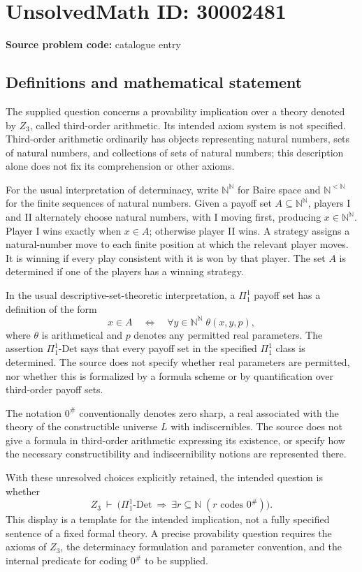 \documentclass[11pt]{article}
\newcommand{\N}{\mathbb{N}}
\begin{document}
\section*{UnsolvedMath ID: 30002481}
\textbf{Source problem code:} catalogue entry
\subsection{Definitions and mathematical statement}
The supplied question concerns a provability implication over a theory denoted by \(Z_3\), called third-order arithmetic. Its intended axiom system is not specified. Third-order arithmetic ordinarily has objects representing natural numbers, sets of natural numbers, and collections of sets of natural numbers; this description alone does not fix its comprehension or other axioms.

For the usual interpretation of determinacy, write \(\N^{\N}\) for Baire space and \(\N^{<\N}\) for the finite sequences of natural numbers. Given a payoff set \(A\subseteq\N^{\N}\), players I and II alternately choose natural numbers, with I moving first, producing \(x\in\N^{\N}\). Player I wins exactly when \(x\in A\); otherwise player II wins. A strategy assigns a natural-number move to each finite position at which the relevant player moves. It is winning if every play consistent with it is won by that player. The set \(A\) is determined if one of the players has a winning strategy.

In the usual descriptive-set-theoretic interpretation, a \(\Pi^1_1\) payoff set has a definition of the form
\[
 x\in A\quad\Longleftrightarrow\quad
 \forall y\in\N^{\N}\;\theta(x,y,p),
\]
where \(\theta\) is arithmetical and \(p\) denotes any permitted real parameters. The assertion \(\Pi^1_1\text{-}\mathrm{Det}\) says that every payoff set in the specified \(\Pi^1_1\) class is determined. The source does not specify whether real parameters are permitted, nor whether this is formalized by a formula scheme or by quantification over third-order payoff sets.

The notation \(0^{\#}\) conventionally denotes zero sharp, a real associated with the theory of the constructible universe \(L\) with indiscernibles. The source does not give a formula in third-order arithmetic expressing its existence, or specify how the necessary constructibility and indiscernibility notions are represented there.

With these unresolved choices explicitly retained, the intended question is whether
\[
 Z_3\ \vdash\
 \bigl(\Pi^1_1\text{-}\mathrm{Det}\ \Longrightarrow\
 \exists r\subseteq\N\;(r\text{ codes }0^{\#})\bigr).
\]
This display is a template for the intended implication, not a fully specified sentence of a fixed formal theory. A precise provability question requires the axioms of \(Z_3\), the determinacy formulation and parameter convention, and the internal predicate for coding \(0^{\#}\) to be supplied.
\end{document}
